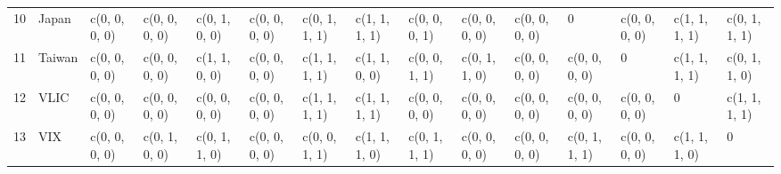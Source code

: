\begin{table}[ht]
\begin{tabular}{lllllllllllllll}
  10 & Japan & c(0, 0, 0, 0) & c(0, 0, 0, 0) & c(0, 1, 0, 0) & c(0, 0, 0, 0) & c(0, 1, 1, 1) & c(1, 1, 1, 1) & c(0, 0, 0, 1) & c(0, 0, 0, 0) & c(0, 0, 0, 0) &             0 & c(0, 0, 0, 0) & c(1, 1, 1, 1) & c(0, 1, 1, 1) \\ 
  11 & Taiwan & c(0, 0, 0, 0) & c(0, 0, 0, 0) & c(1, 1, 0, 0) & c(0, 0, 0, 0) & c(1, 1, 1, 1) & c(1, 1, 0, 0) & c(0, 0, 1, 1) & c(0, 1, 1, 0) & c(0, 0, 0, 0) & c(0, 0, 0, 0) &             0 & c(1, 1, 1, 1) & c(0, 1, 1, 0) \\ 
  12 & VLIC & c(0, 0, 0, 0) & c(0, 0, 0, 0) & c(0, 0, 0, 0) & c(0, 0, 0, 0) & c(1, 1, 1, 1) & c(1, 1, 1, 1) & c(0, 0, 0, 0) & c(0, 0, 0, 0) & c(0, 0, 0, 0) & c(0, 0, 0, 0) & c(0, 0, 0, 0) &             0 & c(1, 1, 1, 1) \\ 
  13 & VIX & c(0, 0, 0, 0) & c(0, 1, 0, 0) & c(0, 1, 1, 0) & c(0, 0, 0, 0) & c(0, 0, 1, 1) & c(1, 1, 1, 0) & c(0, 1, 1, 1) & c(0, 0, 0, 0) & c(0, 0, 0, 0) & c(0, 1, 1, 1) & c(0, 0, 0, 0) & c(1, 1, 1, 0) &             0 \\ 
   \hline
\end{tabular}
\end{table}
